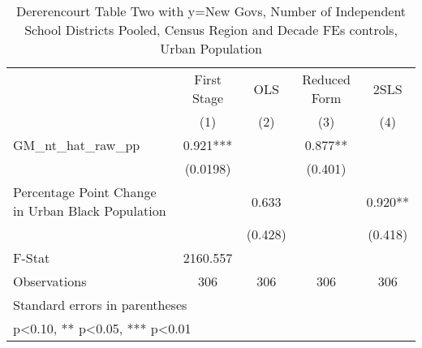 \begin{table}[htbp]\centering
\def\sym#1{\ifmmode^{#1}\else\(^{#1}\)\fi}
\caption{Dererencourt Table Two with y=New Govs, Number of Independent School Districts  Pooled, Census Region and Decade FEs controls, Urban Population}
\begin{tabular}{l*{4}{c}}
\toprule
                    & First Stage   &         OLS   &Reduced Form   &        2SLS   \\
                    &\multicolumn{1}{c}{(1)}   &\multicolumn{1}{c}{(2)}   &\multicolumn{1}{c}{(3)}   &\multicolumn{1}{c}{(4)}   \\
\midrule
GM\_nt\_hat\_raw\_pp    &       0.921***&               &       0.877** &               \\
                    &    (0.0198)   &               &     (0.401)   &               \\
\addlinespace
Percentage Point Change in Urban Black Population&               &       0.633   &               &       0.920** \\
                    &               &     (0.428)   &               &     (0.418)   \\
\midrule
F-Stat              &    2160.557   &               &               &               \\
Observations        &         306   &         306   &         306   &         306   \\
\bottomrule
\multicolumn{5}{l}{\footnotesize Standard errors in parentheses}\\
\multicolumn{5}{l}{\footnotesize * p<0.10, ** p<0.05, *** p<0.01}\\
\end{tabular}
\end{table}
